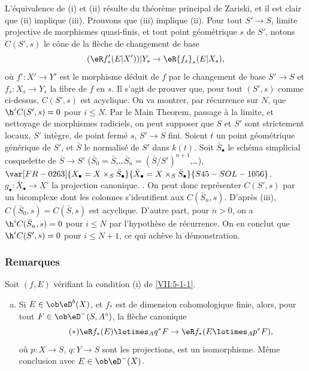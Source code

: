 L'équivalence de (i) et (ii) résulte du théorème principal de Zariski, 
et il est clair que (ii) implique (iii). Prouvons que (iii) implique (ii). Pour 
tout $S'\to S$, limite projective de morphismes quasi-finis, et tout point 
géométrique $s$ de $S'$, notons $C(S',s)$ le cône de la flèche de 
changement de base 
\[
  (\eR f_\ast'(E|X'))|Y_s \to \eR{f_s}_\ast (E|X_s) \text{,} 
\]
où $f':X'\to Y'$ est le morphisme déduit de $f$ par le changement de base 
$S'\to S$ et $f_s:X_s\to Y_s$ la fibre de $f$ en $s$. Il s'agit de prouver que, 
pour tout $(S',s)$ comme ci-dessus, $C(S',s)$ est acyclique. On va montrer, par 
récurrence sur $N$, que $\h^i C(S',s) = 0$ pour $i\leqslant N$. Par le Main 
Theorem, passage à la limite, et nettoyage de morphismes radiciels, on peut 
supposer que $S$ et $S'$ sont strictement locaux, $S'$ intègre, de point 
fermé $s$, $S'\to S$ fini. Soient $t$ un point géométrique générique 
de $S'$, et $\bar S$ le normalisé de $S'$ dans $k(t)$. Soit $\bar S_\bullet$ 
le schéma simplicial cosquelette de $\bar S\to S'$ 
($\bar S_0=\bar S$,\ldots $\bar S_n=(\bar S/S')^{n+1}$,\ldots), 
$\var[FR-0263]{X_\bullet=X\times_S \bar S_\bullet}{\bar X_\bullet=X\times_S \bar S_\bullet}{S45-SOL-1056}$. $g_\bullet:\bar X_\bullet \to X'$ la 
projection canonique.  . On 
peut donc représenter $C(S',s)$ par un bicomplexe dont les colonnes 
s'identifient aux $C(\bar S_n,s)$. D'après (iii), $C(\bar S_0,s)=C(\bar S,s)$ 
est acyclique. D'autre part, pour $n>0$, on a $\h^i C(\bar S_n,s)=0$ pour 
$i\leqslant N$ par l'hypothèse de récurrence. On en conclut que 
$\h^i C(S',s)=0$ pour $i\leqslant N+1$, ce qui achève la démonstration. 





\subsubsection{Remarques}\label{VII:5-1-2}

Soit $(f,E)$ vérifiant la condition (i) de \ref{VII:5-1-1}. 
\begin{enumerate}[a)]
  \item Si $E\in \ob \eD^b(X)$, et $f_\ast$ est de dimension cohomologique 
    finie, alors, pour tout $F\in \ob\eD^-(S,A^\circ)$, la flèche canonique 
    \begin{equation*}\tag{$*$}\label{VII:eq:5-1-1-1}
      \eR f_\ast(E)\lotimes_A q^\ast F \to \eR f_\ast(E\lotimes_A p^\ast F) \text{,} 
    \end{equation*}
    où $p:X\to S$, $q:Y\to S$ sont les projections, est un isomorphisme. 
    Même conclusion avec $E\in\ob\eD^-(X)$. 
\end{enumerate} 

